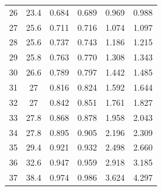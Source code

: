 \begin{table}[H]
\begin{tabular}{cccccc}
    26         & 23.4                        & 0.684                      & 0.689                       & 0.969                   & 0.988                   \\
    27         & 25.6                        & 0.711                      & 0.716                       & 1.074                   & 1.097                   \\
    28         & 25.6                        & 0.737                      & 0.743                       & 1.186                   & 1.215                   \\
    29         & 25.8                        & 0.763                      & 0.770                       & 1.308                   & 1.343                   \\
    30         & 26.6                        & 0.789                      & 0.797                       & 1.442                   & 1.485                   \\
    31         & 27                          & 0.816                      & 0.824                       & 1.592                   & 1.644                   \\
    32         & 27                          & 0.842                      & 0.851                       & 1.761                   & 1.827                   \\
    33         & 27.8                        & 0.868                      & 0.878                       & 1.958                   & 2.043                   \\
    34         & 27.8                        & 0.895                      & 0.905                       & 2.196                   & 2.309                   \\
    35         & 29.4                        & 0.921                      & 0.932                       & 2.498                   & 2.660                   \\
    36         & 32.6                        & 0.947                      & 0.959                       & 2.918                   & 3.185                   \\
    37         & 38.4                        & 0.974                      & 0.986                       & 3.624                   & 4.297         \\
    \bottomrule         
    \end{tabular}
    \end{table}


